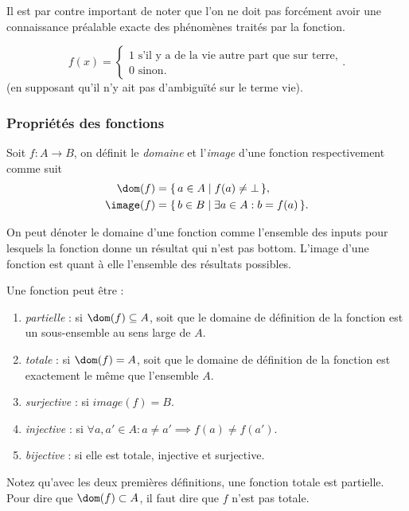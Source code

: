 Il est par contre important de noter que l'on ne doit pas forcément avoir une connaissance préalable exacte des phénomènes traités par la fonction.
\begin{myexem}
  $$
  f(x) = \begin{cases} 1 \text{  s'il y a de la vie autre part que sur terre,} \\ 
  0 \text{  sinon.}\end{cases}.
  $$
  (en supposant qu'il n'y ait pas d'ambiguïté sur le terme \og vie\fg).


\subsubsection{Propriétés des fonctions}
\label{par:proprietes_des_fonctions}
Soit $f\colon A \to B$, on définit le \emph{domaine} et l'\emph{image} d'une fonction respectivement comme suit
\begin{align*}
  \dom(f)   & = \{\, a \in A \mid f(a) \neq \bot \,\},\\
  \image(f) & = \{\, b \in B \mid \exists a \in A : b = f(a) \,\}.
\end{align*}

On peut dénoter le domaine d'une fonction comme l'ensemble des inputs pour lesquels la fonction donne un résultat qui n'est pas bottom. L'image d'une fonction est quant à elle l'ensemble des résultats possibles.

\noindent Une fonction peut être :
\begin{enumerate}
    \item \emph{partielle} : si $\dom(f) \subseteq A$, soit que le domaine de définition de la fonction est un sous-ensemble au sens large de $A$.
    \item \emph{totale} : si $\dom(f) = A$, soit que le domaine de définition de la fonction est exactement le même que l'ensemble $A$.
    \item \emph{surjective} : si $image(f) = B$.
    \item \emph{injective} : si $\forall a,a' \in A : a \neq a' \implies f(a) \neq f(a')$.
    \item \emph{bijective} : si elle est totale, injective et surjective.
\end{enumerate}

\begin{myrem}
    Notez qu'avec les deux premières définitions, une fonction totale est partielle.
    Pour dire que $\dom(f) \subset A$, il faut dire que $f$ n'est pas totale.
\end{myrem}



\end{myexem}
